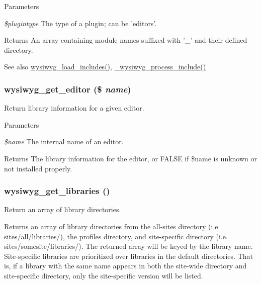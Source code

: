 \begin{DoxyParams}{Parameters}
\item[{\em \$plugintype}]The type of a plugin; can be 'editors'.\end{DoxyParams}
\begin{DoxyReturn}{Returns}
An array containing module names suffixed with '\_\-' and their defined directory.
\end{DoxyReturn}
\begin{DoxySeeAlso}{See also}
\hyperlink{group__wysiwyg__api_gae5880da976120e85f7bb8aeda815b060}{wysiwyg\_\-load\_\-includes()}, \hyperlink{group__wysiwyg__api_ga81487ce9ea49d7ca7b052bb8f2e8fcc8}{\_\-wysiwyg\_\-process\_\-include()} 
\end{DoxySeeAlso}
\hypertarget{group__wysiwyg__api_gaf5c3c86f49f33be930fa6f9b5405a2a6}{
\subsubsection[{wysiwyg\_\-get\_\-editor}]{\setlength{\rightskip}{0pt plus 5cm}wysiwyg\_\-get\_\-editor (\$ {\em name})}}
\label{group__wysiwyg__api_gaf5c3c86f49f33be930fa6f9b5405a2a6}
Return library information for a given editor.


\begin{DoxyParams}{Parameters}
\item[{\em \$name}]The internal name of an editor.\end{DoxyParams}
\begin{DoxyReturn}{Returns}
The library information for the editor, or FALSE if \$name is unknown or not installed properly. 
\end{DoxyReturn}
\hypertarget{group__wysiwyg__api_ga2918aa22fa830564c63c0df96a625379}{
\subsubsection[{wysiwyg\_\-get\_\-libraries}]{\setlength{\rightskip}{0pt plus 5cm}wysiwyg\_\-get\_\-libraries ()}}
\label{group__wysiwyg__api_ga2918aa22fa830564c63c0df96a625379}
Return an array of library directories.

Returns an array of library directories from the all-\/sites directory (i.e. sites/all/libraries/), the profiles directory, and site-\/specific directory (i.e. sites/somesite/libraries/). The returned array will be keyed by the library name. Site-\/specific libraries are prioritized over libraries in the default directories. That is, if a library with the same name appears in both the site-\/wide directory and site-\/specific directory, only the site-\/specific version will be listed.

